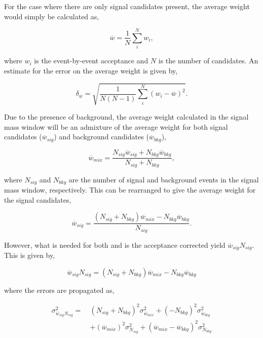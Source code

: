 For the case where there are only signal candidates present, the average weight would simply be calculated as,
 
\begin{equation}
\overline{w} = \frac{1}{N}\sum\limits_{i}^{N}w_{i},
\label{eqn:average_eff}
\end{equation}
 
\noindent where $w_{i}$ is the event-by-event acceptance and $N$ is the number of candidates.  An estimate for the error on the average weight is given by,
 
\begin{equation}
\delta_{\overline{w}} = \sqrt{\frac{1}{N(N-1)}\sum\limits_{i}^{N}(w_{i}-\overline{w})^{2}}.
\end{equation}
 
Due to the presence of background, the average weight calculated in the signal mass window will be an admixture of the average weight for both signal candidates ($\overline{w}_{sig}$) and background candidates ($\overline{w}_{bkg}$),
 
\begin{equation}
\overline{w}_{mix} = \frac{N_{sig}\overline{w}_{sig} + N_{bkg}\overline{w}_{bkg}}{N_{sig}+N_{bkg}},
\end{equation}
 
\noindent where $N_{sig}$ and $N_{bkg}$ are the number of signal and background events in the signal mass window, respectively. This can be rearranged to give the average weight for the signal candidates,
 
\begin{equation}
\overline{w}_{sig} = \frac{(N_{sig}+N_{bkg})\overline{w}_{mix} -  N_{bkg}\overline{w}_{bkg}}{N_{sig}}.
\end{equation}
 
However, what is needed for both \BdToKpimm and \BdToJPsiKst is the acceptance corrected yield $\overline{w}_{sig}N_{sig}$.  This is given by,
 
\begin{equation}
\overline{w}_{sig}N_{sig} = (N_{sig}+N_{bkg})\overline{w}_{mix} -  N_{bkg}\overline{w}_{bkg}
\end{equation}
 
\noindent where the errors are propagated as,
 
\begin{equation}
\begin{split}
\sigma_{\overline{w}_{sig}N_{sig}}^{2} =~ &(N_{sig}+N_{bkg})^{2}\sigma_{\overline{w}_{mix}}^{2} + (-N_{bkg})^{2}\sigma_{\overline{w}_{bkg}}^{2}\\
&+(\overline{w}_{mix})^{2}\sigma_{N_{sig}}^{2} + (\overline{w}_{mix}-\overline{w}_{bkg})^{2}\sigma_{N_{bkg}}^{2}
\end{split}
\end{equation}
 
